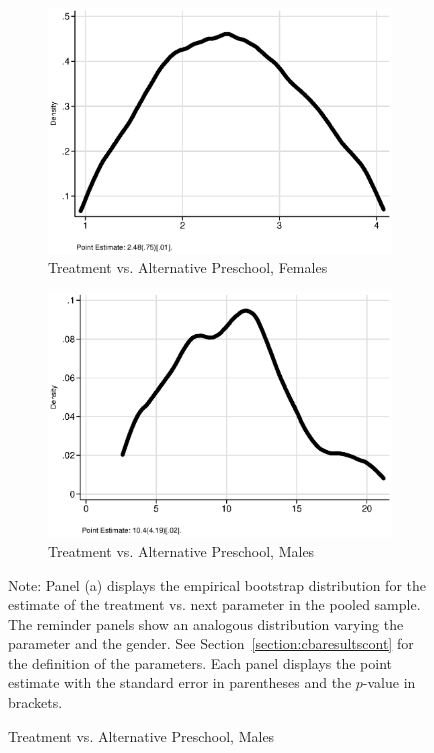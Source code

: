 \begin{figure}
\begin{subfigure}[h]{0.25\textwidth}
\end{subfigure}%
\begin{subfigure}[h]{0.25\textwidth}
	\centering
	\caption{Treatment vs. Alternative Preschool, Females}
		\includegraphics[width=\textwidth]{output/ratios_8_sexf.eps}
\end{subfigure}%
\begin{subfigure}[h]{0.25\textwidth}
	\centering
	\caption{Treatment vs. Alternative Preschool, Males}
		\includegraphics[width=\textwidth]{output/ratios_8_sexm.eps}
\end{subfigure}
\footnotesize \justify
Note: Panel (a) displays the empirical bootstrap distribution for the estimate of the treatment vs. next parameter in the pooled sample. The reminder panels show an analogous distribution varying the parameter and the gender. See Section~\ref{section:cbaresultscont} for the definition of the parameters. Each panel displays the point estimate with the standard error in parentheses and the $p$-value in brackets.
\end{figure}
\restoregeometry
\doublespacing

